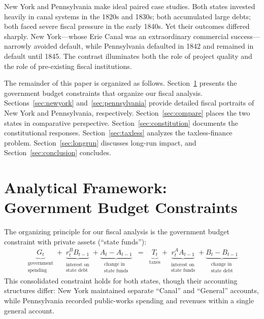 \documentclass[11pt]{article}
\begin{document}
New York and Pennsylvania make ideal paired case studies.  Both states invested
heavily in canal systems in the 1820s and 1830s; both accumulated large debts;
both faced severe fiscal pressure in the early 1840s.  Yet their outcomes
differed sharply.  New York---whose Erie Canal was an extraordinary commercial
success---narrowly avoided default, while Pennsylvania defaulted in 1842 and
remained in default until 1845.  The contrast illuminates both the role of
project quality and the role of pre-existing fiscal institutions.

The remainder of this paper is organized as follows.  Section~\ref{sec:framework}
presents the government budget constraints that organize our fiscal analysis.
Sections~\ref{sec:newyork} and~\ref{sec:pennsylvania} provide detailed fiscal
portraits of New York and Pennsylvania, respectively.  Section~\ref{sec:compare}
places the two states in comparative perspective.  Section~\ref{sec:constitution}
documents the constitutional responses.  Section~\ref{sec:taxless} analyzes the
taxless-finance problem.  Section~\ref{sec:longrun} discusses long-run impact,
and Section~\ref{sec:conclusion} concludes.

\section{Analytical Framework: Government Budget Constraints}
\label{sec:framework}

The organizing principle for our fiscal analysis is the government budget
constraint with private assets (``state funds''):
\begin{eqnarray}
\underbrace{G_t}_{\substack{\text{government}\\\text{spending}}}
  + \underbrace{r_t^B B_{t-1}}_{\substack{\text{interest on}\\\text{state debt}}}
  + \underbrace{A_t - A_{t-1}}_{\substack{\text{change in}\\ \text{state funds}}}
  &=& \underbrace{T_t}_{\text{taxes}}
     + \underbrace{r_t^A A_{t-1}}_{\substack{\text{interest on}\\ \text{state funds}}}
     + \underbrace{B_t - B_{t-1}}_{\substack{\text{change in}\\ \text{state debt}}}
\label{eq:consolidated_bc}
\end{eqnarray}
This consolidated constraint holds for both states,
though their accounting structures differ: New York maintained
separate ``Canal'' and ``General'' accounts, while Pennsylvania
recorded public-works spending and revenues within a single general account.
\end{document}
